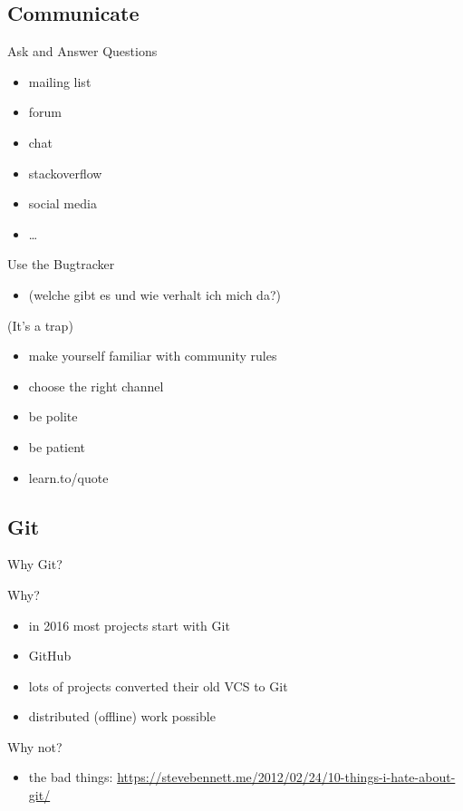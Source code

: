 \documentclass{beamer}
\begin{document}
\subsection{Communicate}

\begin{frame}{Ask and Answer Questions}
    \begin{itemize}
        \item mailing list
        \item forum
        \item chat
        \item stackoverflow
        \item social media
        \item \dots
    \end{itemize}
\end{frame}

\begin{frame}{Use the Bugtracker}
    \begin{itemize}
        \item (welche gibt es und wie verhalt ich mich da?)
    \end{itemize}
\end{frame}

\begin{frame}{(It's a trap)}
    \begin{itemize}
        \item make yourself familiar with community rules
        \item choose the right channel
        \item be polite
        \item be patient
        \item learn.to/quote
    \end{itemize}
\end{frame}

\subsection{Git}

\begin{frame}{Why Git?}
    \begin{exampleblock}{Why?}
        \begin{itemize}
            \item in 2016 most projects start with Git
            \item GitHub
            \item lots of projects converted their old VCS to Git
            \item distributed (offline) work possible
        \end{itemize}
    \end{exampleblock}
    \pause
    \begin{alertblock}{Why not?}
        \begin{itemize}
            \item the bad things: \url{https://stevebennett.me/2012/02/24/10-things-i-hate-about-git/}
        \end{itemize}
    \end{alertblock}
\end{frame}
\end{document}
